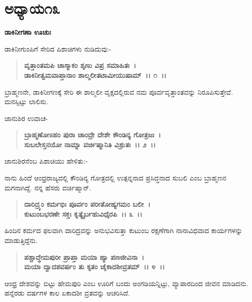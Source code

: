 \newpage

\section*{ಅಧ್ಯಾಯ\enginline{-}೧೩}

\emptypage

\begin{flushleft}
\textbf{ಡಾಕಿನೀಗಣಾ ಊಚುಃ\enginline{-}}
\end{flushleft}

ಡಾಕಿನೀಗುಂಪಿಗೆ ಸೇರಿದ ಪಿಶಾಚಿಗಳು ನುಡಿದುವು:-

\begin{verse}
\textbf{ವೃತ್ತಾಂತಮಪಿ ಚಾಸ್ಮಾಕಂ ಶೃಣು ವಿಪ್ರ ಸಮಾಹಿತಃ~।}\\\textbf{ಡಾಕಿನೀತ್ವಮವಾಪ್ತಾನಾಂ ಶಾಲ್ಮಲೀತಟಾಮೀಯುಷಾಮ್~।। ೧~।।}
\end{verse}

ಬ್ರಾಹ್ಮಣನೇ, ಡಾಕಿನೀಗಣಕ್ಕೆ ಸೇರಿ ಈ ಶಾಲ್ಮಲೀ ವೃಕ್ಷದಲ್ಲಿರುವ ನಮ ಪೂರ್ವವೃತ್ತಾಂತವನ್ನು ನಿರೂಪಿಸುತ್ತೇವೆ. ಮನಸ್ಸಿಟ್ಟು ಲಾಲಿಸು.

\begin{flushleft}
ಜಾನುಶಿರ ಉವಾಚ-
\end{flushleft}

\begin{verse}
\textbf{ಬ್ರಾಹ್ಮಣೋಽಹಂ ಪುರಾ ಚಾಂದ್ರೇ ದೇಶೇ ಕೌಂಡಿನ್ಯ ಗೋತ್ರಜಃ~।}\\\textbf{ಸುಬಲೇಸ್ತನಯೋ ನಾಮ್ನಾ ವರ್ಚಿಷ್ಮಾನಿತಿ ವಿಶ್ರುತಃ~।। ೨~।।}
\end{verse}

ಜಾನುಶಿರನೆಂಬ ಪಿಶಾಚಿಯು ಹೇಳಿತು:-

ನಾನು ಹಿಂದೆ ಆಂಧ್ರರಾಜ್ಯದಲ್ಲಿ ಕೌಂಡಿನ್ಯ ಗೋತ್ರದಲ್ಲಿ ಉತ್ಪನ್ನನಾದ ಪ್ರಸಿದ್ಧನಾದ ಸುಬಲಿ ಎಂಬ ಬ್ರಾಹ್ಮಣನ ಮಗನಾಗಿದ್ದೆ. ನನ್ನ ಹೆಸರು ವರ್ಚಿಷ್ಮಾನ್.

\begin{verse}
\textbf{ದಾರಿದ್ರ್ಯಂ ಕರ್ಮಭಿಃ ಪೂರ್ವಂ ಪರೀತೋಹ್ಯಗಮಂ ಬಲೀ~।}\\\textbf{ಕುಟುಂಬಭರಣೇ ಸಕ್ತಃ ಕೃತ್ಯೈರ್ಬಹುವಿಧೈರಪಿ~।। ೩~।।}
\end{verse}

ಹಿಂದಿನ ಕರ್ಮದ ಫಲವಾಗಿ ದಾರಿದ್ರವನ್ನು ಅನುಭವಿಸುತ್ತಾ ಕುಟುಂಬ ರಕ್ಷಣೆಗಾಗಿ ನಾನಾವಿಧವಾದ ಕಾರ್ಯಗಳನ್ನು ಮಾಡುತ್ತಿದ್ದೆನು.

\begin{verse}
\textbf{ಪಶ್ಚಾದ್ಧೇಮಪುರೀ ಪ್ರಾಪ್ತಾ ಮಯಾ ಹ್ಯಾ ಪಣಜೀವಿನಾ~।}\\\textbf{ಮಯಾ ದ್ವಾದಶವರ್ಷಂ ತು ಕೃತಂ ಚೈಕಾದಶೀವ್ರತಮ್~।। ೪~।।}
\end{verse}

ಆಂಧ್ರ ದೇಶವನ್ನು ಬಿಟ್ಟು ಹೇಮಪುರಿ ಎಂಬ ಊರಿಗೆ ಬಂದು ಅಂಗಡಿಯನ್ನಿಟ್ಟು, ವ್ಯಾಪಾರದಿಂದ ಜೀವನ ಮಾಡಿದನು. ಹನ್ನೆರಡು ವರ್ಷಗಳ ಕಾಲ ಏಕಾದಶೀ ವ್ರತವನ್ನು ಆಚರಿಸಿದೆ.

